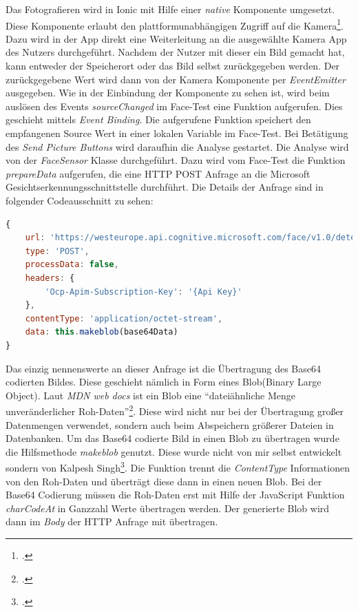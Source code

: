 Das Fotografieren wird in Ionic mit Hilfe einer \textit{native} Komponente umgesetzt. Diese Komponente erlaubt den plattformunabhängigen Zugriff auf die Kamera\footcite{Ion18e}. Dazu wird in der App direkt eine Weiterleitung an die ausgewählte Kamera App des Nutzers durchgeführt. Nachdem der Nutzer mit dieser ein Bild gemacht hat, kann entweder der Speicherort oder das Bild selbst zurückgegeben werden. Der zurückgegebene Wert wird dann von der Kamera Komponente per \textit{EventEmitter} ausgegeben.\newline
Wie in der Einbindung der Komponente zu sehen ist, wird beim auslösen des Events \textit{sourceChanged} im Face-Test eine Funktion aufgerufen. Dies geschieht mittels \textit{Event Binding}. Die aufgerufene Funktion speichert den empfangenen Source Wert in einer lokalen Variable im Face-Test. Bei Betätigung des \textit{Send Picture Buttons} wird daraufhin die Analyse gestartet. Die Analyse wird von der \textit{FaceSensor} Klasse durchgeführt. Dazu wird vom Face-Test die Funktion \textit{prepareData} aufgerufen, die eine HTTP POST Anfrage an die Microsoft Gesichtserkennungsschnittstelle durchführt. Die Details der Anfrage sind in folgender Codeausschnitt zu sehen: \newline
\begin{lstlisting}[caption={Aufbau Anfrage an Gesichtserkennungsschnittstelle}, language=JavaScript]
{
	url: 'https://westeurope.api.cognitive.microsoft.com/face/v1.0/detect?returnFaceAttributes=emotion',
	type: 'POST',
	processData: false,
	headers: {
		'Ocp-Apim-Subscription-Key': '{Api Key}'
	},
	contentType: 'application/octet-stream',
	data: this.makeblob(base64Data)
}
\end{lstlisting}
Das einzig nennenswerte an dieser Anfrage ist die Übertragung des Base64 codierten Bildes. Diese geschieht nämlich in Form eines Blob(Binary Large Object). Laut \textit{MDN web docs} ist ein Blob eine ``dateiähnliche Menge unveränderlicher Roh-Daten''\footcite[Vgl. ][Abschnitt Übersicht]{Mdn18}. Diese wird nicht nur bei der Übertragung großer Datenmengen verwendet, sondern auch beim Abspeichern größerer Dateien in Datenbanken. Um das Base64 codierte Bild in einen Blob zu übertragen wurde die Hilfsmethode \textit{makeblob} genutzt. Diese wurde nicht von mir selbst entwickelt sondern von Kalpesh Singh\footcite[Vgl. ][Antwort von Kalpesh Singh]{Sin16}. Die Funktion trennt die \textit{ContentType} Informationen von den Roh-Daten und überträgt diese dann in einen neuen Blob. Bei der Base64 Codierung müssen die Roh-Daten erst mit Hilfe der JavaScript Funktion \textit{charCodeAt} in Ganzzahl Werte übertragen werden. Der generierte Blob wird dann im \textit{Body} der HTTP Anfrage mit übertragen.\newline
